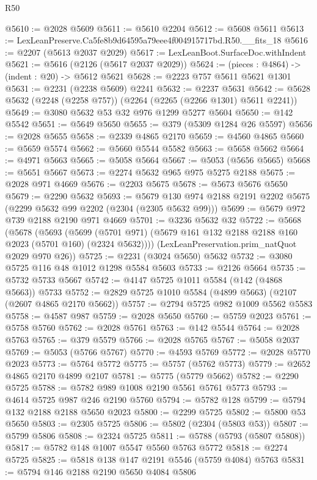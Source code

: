 \begin{lexlean}{R50}
\begin{coremodule}
@5610 := @2028 @5609
@5611 := @5610 @2204
@5612 := @5608 @5611
@5613 := LexLeanPreserve.Ca5fe8b9d64595a79eee4f004915717bd.R50.__fits_18
@5616 := @2207 (@5613 @2037 @2029)
@5617 := LexLeanBoot.SurfaceDoc.withIndent
@5621 := @5616 (@2126 (@5617 @2037 @2029))
@5624 := (pieces : @4864) -> (indent : @20) -> @5612 @5621
@5628 := @2223 @757 @5611 @5621 @1301
@5631 := @2231 (@2238 @5609) @2241
@5632 := @2237 @5631
@5642 := @5628 @5632 (@2248 (@2258 @757)) (@2264 (@2265 (@2266 @1301) @5611 @2241))
@5649 := @3080 @5632 @53 @32 @976 @1299 @5277 @5604
@5650 := @142 @5542
@5651 := @5649 @5650
@5655 := @379 (@5309 @1284 @26 @5597)
@5656 := @2028 @5655
@5658 := @2339 @4865 @2170
@5659 := @4560 @4865
@5660 := @5659 @5574
@5662 := @5660 @5544 @5582
@5663 := @5658 @5662
@5664 := @4971 @5663
@5665 := @5058 @5664
@5667 := @5053 (@5656 @5665)
@5668 := @5651 @5667
@5673 := @2274 @5632 @965 @975 @5275 @2188
@5675 := @2028 @971 @4669
@5676 := @2203 @5675
@5678 := @5673 @5676 @5650
@5679 := @2290 @5632
@5693 := @5679 @130 @974 @2188 @2191 @2202 @5675 (@2299 @5632 @99 @2202 (@2304 (@2305 @5632 @99)))
@5699 := @5679 @972 @739 @2188 @2190 @971 @4669
@5701 := @3236 @5632 @32
@5722 := @5668
    (@5678
      (@5693
        (@5699 (@5701 @971) (@5679 @161 @132 @2188 @2188 @160 @2023 (@5701 @160) (@2324 @5632))))
      (LexLeanPreservation.prim_natQuot @2029 @970 @26))
@5725 := @2231 (@3024 @5650) @5632
@5732 := @3080 @5725 @116 @48 @1012 @1298 @5584 @5603
@5733 := @2126 @5664
@5735 := @5732 @5733 @5667
@5742 := @4147 @5725 @1011 @5584 (@142 (@4868 @5663)) @5733
@5752 := @2829 @5725 @1010 @5584 (@4899 @5663) (@2107 (@2607 @4865 @2170 @5662))
@5757 := @2794 @5725 @982 @1009 @5562 @5583
@5758 := @4587 @987
@5759 := @2028 @5650
@5760 := @5759 @2023
@5761 := @5758 @5760
@5762 := @2028 @5761
@5763 := @142 @5544
@5764 := @2028 @5763
@5765 := @379 @5579
@5766 := @2028 @5765
@5767 := @5058 @2037
@5769 := @5053 (@5766 @5767)
@5770 := @4593 @5769
@5772 := @2028 @5770 @2023
@5773 := @5764 @5772
@5775 := @5757 (@5762 @5773)
@5779 := @2652 @4865 @2170 @4899 @2107
@5781 := @5775 (@5779 @5662)
@5782 := @2290 @5725
@5788 := @5782 @989 @1008 @2190 @5561 @5761 @5773
@5793 := @4614 @5725 @987 @246 @2190 @5760
@5794 := @5782 @128
@5799 := @5794 @132 @2188 @2188 @5650 @2023
@5800 := @2299 @5725
@5802 := @5800 @53 @5650
@5803 := @2305 @5725
@5806 := @5802 (@2304 (@5803 @53))
@5807 := @5799 @5806
@5808 := @2324 @5725
@5811 := @5788 (@5793 (@5807 @5808))
@5817 := @5782 @148 @1007 @5547 @5560 @5763 @5772
@5818 := @2274 @5725
@5825 := @5818 @138 @147 @2191 @5546 (@5759 @4084) @5763
@5831 := @5794 @146 @2188 @2190 @5650 @4084 @5806

\end{coremodule}
\end{lexlean}
